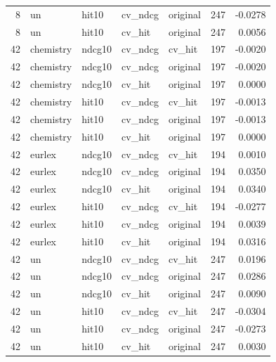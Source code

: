 \begin{tabular}{rllllrr}
8 & un & hit10 & cv\_ndcg & original & 247 & -0.0278 \\
8 & un & hit10 & cv\_hit & original & 247 & 0.0056 \\
42 & chemistry & ndcg10 & cv\_ndcg & cv\_hit & 197 & -0.0020 \\
42 & chemistry & ndcg10 & cv\_ndcg & original & 197 & -0.0020 \\
42 & chemistry & ndcg10 & cv\_hit & original & 197 & 0.0000 \\
42 & chemistry & hit10 & cv\_ndcg & cv\_hit & 197 & -0.0013 \\
42 & chemistry & hit10 & cv\_ndcg & original & 197 & -0.0013 \\
42 & chemistry & hit10 & cv\_hit & original & 197 & 0.0000 \\
42 & eurlex & ndcg10 & cv\_ndcg & cv\_hit & 194 & 0.0010 \\
42 & eurlex & ndcg10 & cv\_ndcg & original & 194 & 0.0350 \\
42 & eurlex & ndcg10 & cv\_hit & original & 194 & 0.0340 \\
42 & eurlex & hit10 & cv\_ndcg & cv\_hit & 194 & -0.0277 \\
42 & eurlex & hit10 & cv\_ndcg & original & 194 & 0.0039 \\
42 & eurlex & hit10 & cv\_hit & original & 194 & 0.0316 \\
42 & un & ndcg10 & cv\_ndcg & cv\_hit & 247 & 0.0196 \\
42 & un & ndcg10 & cv\_ndcg & original & 247 & 0.0286 \\
42 & un & ndcg10 & cv\_hit & original & 247 & 0.0090 \\
42 & un & hit10 & cv\_ndcg & cv\_hit & 247 & -0.0304 \\
42 & un & hit10 & cv\_ndcg & original & 247 & -0.0273 \\
42 & un & hit10 & cv\_hit & original & 247 & 0.0030 \\
\bottomrule
\end{tabular}
